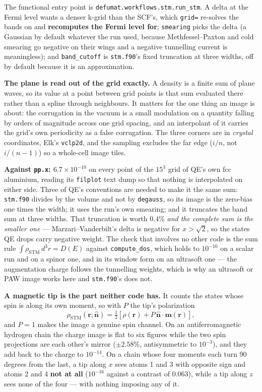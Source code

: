 \documentclass[11pt,a4paper]{article}
\newcommand{\code}[1]{\texttt{\small #1}}
\begin{document}
The functional entry point is \code{defumat.workflows.stm.run\_stm}. A delta at
the Fermi level wants a denser k-grid than the SCF's, which \code{grid=}
re-solves the bands on and \textbf{recomputes the Fermi level for}; \code{smearing}
picks the delta (a Gaussian by default whatever the run used, because
Methfessel--Paxton and cold smearing go negative on their wings and a negative
tunnelling current is meaningless); and \code{band\_cutoff} is \code{stm.f90}'s
fixed truncation at three widths, off by default because it is an approximation.

\textbf{The plane is read out of the grid exactly.} A density is a finite sum
of plane waves, so its value at a point between grid points is that sum
evaluated there rather than a spline through neighbours. It matters for the one
thing an image is about: the corrugation in the vacuum is a small modulation on
a quantity falling by orders of magnitude across one grid spacing, and an
interpolant of it carries the grid's own periodicity as a false corrugation.
The three corners are in \emph{crystal} coordinates, Elk's \code{vclp2d}, and
the sampling excludes the far edge ($i/n$, not $i/(n-1)$) so a whole-cell image
tiles.

\textbf{Against \code{pp.x}: $6.7\times10^{-10}$} on every point of the
$15^3$ grid of QE's own fcc aluminium, reading its \code{filplot} text dump so
that nothing is interpolated on either side. Three of QE's conventions are
needed to make it the same sum: \code{stm.f90} divides by the volume and not by
\code{degauss}, so its image is the zero-bias one times the width; it uses the
run's own smearing; and it truncates the band sum at three widths. That
truncation is worth 0.4\% \emph{and the complete sum is the smaller one} ---
Marzari--Vanderbilt's delta is negative for $x > \sqrt2$, so the states QE drops
carry negative weight. The check that involves no other code is the sum rule
$\int\rho_{\mathrm{STM}}\,d^3r = D(E)$ against \code{compute\_dos}, which holds
to $10^{-10}$ on a scalar run and on a spinor one, and in its window form on an
ultrasoft one --- the augmentation charge follows the tunnelling weights, which
is why an ultrasoft or PAW image works here and \code{stm.f90}'s does not.

\textbf{A magnetic tip is the part neither code has.} It counts the states
whose spin is along its own moment, so with $P$ the tip's polarization
\begin{equation*}
  \rho_{\mathrm{STM}}(\mathbf r; \hat{\mathbf n})
   = \tfrac12\left[\rho(\mathbf r)
     + P\,\hat{\mathbf n}\cdot\mathbf m(\mathbf r)\right],
\end{equation*}
and $P = 1$ makes the image a genuine spin channel. On an antiferromagnetic
hydrogen chain the charge image is flat to six figures while the two spin
projections are each other's mirror ($\pm 2.58\%$, antisymmetric to $10^{-3}$),
and they add back to the charge to $10^{-14}$. On a chain whose four moments
each turn 90 degrees from the last, a tip along $x$ sees atoms 1 and 3 with
opposite sign and atoms 2 and 4 \textbf{not at all} ($10^{-16}$ against a
contrast of 0.063), while a tip along $z$ sees none of the four --- with nothing
imposing any of it.
\end{document}
